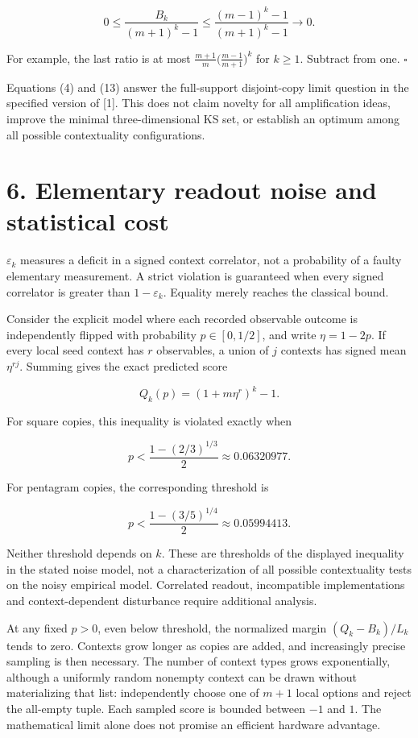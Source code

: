 \documentclass[10pt,a4paper]{article}
\begin{document}
\[0\le\frac{B_k}{(m+1)^k-1}
\le\frac{(m-1)^k-1}{(m+1)^k-1}\longrightarrow0. \tag{13}\]

For example, the last ratio is at most \(\frac{m+1}{m}\bigl(\frac{m-1}{m+1}\bigr)^k\) for \(k\ge1\). Subtract from one. \(\square\)

Equations (4) and (13) answer the full-support disjoint-copy limit question in the specified version of {[}1{]}. This does not claim novelty for all amplification ideas, improve the minimal three-dimensional KS set, or establish an optimum among all possible contextuality configurations.

\section{6. Elementary readout noise and statistical cost}\label{elementary-readout-noise-and-statistical-cost}

\(\varepsilon_k\) measures a deficit in a signed context correlator, not a probability of a faulty elementary measurement. A strict violation is guaranteed when every signed correlator is greater than \(1-\varepsilon_k\). Equality merely reaches the classical bound.

Consider the explicit model where each recorded observable outcome is independently flipped with probability \(p\in[0,1/2]\), and write \(\eta=1-2p\). If every local seed context has \(r\) observables, a union of \(j\) contexts has signed mean \(\eta^{rj}\). Summing gives the exact predicted score

\[Q_k(p)=(1+m\eta^r)^k-1. \tag{14}\]

For square copies, this inequality is violated exactly when

\[p<\frac{1-(2/3)^{1/3}}2\approx0.06320977. \tag{15}\]

For pentagram copies, the corresponding threshold is

\[p<\frac{1-(3/5)^{1/4}}2\approx0.05994413. \tag{16}\]

Neither threshold depends on \(k\). These are thresholds of the displayed inequality in the stated noise model, not a characterization of all possible contextuality tests on the noisy empirical model. Correlated readout, incompatible implementations and context-dependent disturbance require additional analysis.

At any fixed \(p>0\), even below threshold, the normalized margin \((Q_k-B_k)/L_k\) tends to zero. Contexts grow longer as copies are added, and increasingly precise sampling is then necessary. The number of context types grows exponentially, although a uniformly random nonempty context can be drawn without materializing that list: independently choose one of \(m+1\) local options and reject the all-empty tuple. Each sampled score is bounded between \(-1\) and \(1\). The mathematical limit alone does not promise an efficient hardware advantage.
\end{document}
